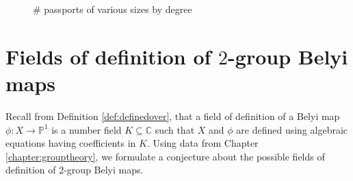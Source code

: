 \documentclass{dcthesis}
\newcommand{\PP}{\mathbb P}
\newcommand{\CC}{\mathbb C}
\newcommand{\QQ}{\mathbb Q}
\newcommand{\defi}[1]{\textsf{#1}}
\newcommand{\mm}[1]{{\color{blue} \sf MM: [#1]}}
\numberwithin{equation}{section}
\newtheorem{theorem}[equation]{Theorem}
\theoremstyle{definition}
\newtheorem{definition}[equation]{Definition}
\theoremstyle{remark}
\begin{document}
{{{\begin{figure}[ht]
      \label{fig:passportsizes}
      \caption{
        \# passports of various sizes by degree
      }
    \end{figure}
  }
}
\chapter{Fields of definition of $2$-group Belyi maps}{\label{chapter:fieldsofdefinition}
  Recall from Definition
  \ref{def:definedover},
  that a field of definition of a Belyi map
  $\phi\colon X\to\PP^1$
  is a number field
  $K\subseteq\CC$
  such that $X$ and $\phi$
  are defined using algebraic equations
  having coefficients in $K$.
  Using data from Chapter
  \ref{chapter:grouptheory},
  we formulate a conjecture about
  the possible fields of definition of
  $2$-group Belyi maps.
}}
\end{document}
